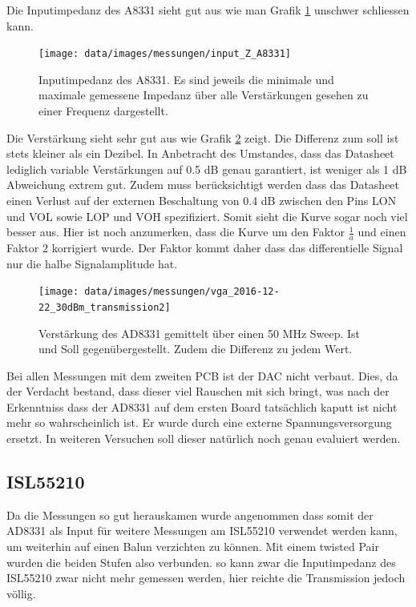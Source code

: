Die Inputimpedanz des A8331 sieht gut aus wie man Grafik \ref{fig:Z_in_A8331} unschwer schliessen kann.

\begin{figure}[H]
\begin{center}
    \texttt{[image: data/images/messungen/input\_Z\_A8331]}
    \caption{Inputimpedanz des A8331. Es sind jeweils die minimale und maximale gemessene Impedanz über alle Verstärkungen gesehen zu einer Frequenz dargestellt.}
    \label{fig:Z_in_A8331}
\end{center}
\end{figure}

Die Verstärkung sieht sehr gut aus wie Grafik \ref{fig:T_A8331} zeigt. Die Differenz zum soll ist stets kleiner als ein Dezibel. In Anbetracht des Umstandes, dass das Datasheet lediglich variable Verstärkungen auf 0.5 dB genau garantiert, ist weniger als 1 dB Abweichung extrem gut. Zudem muss berücksichtigt werden dass das Datasheet einen Verlust auf der externen Beschaltung von 0.4 dB zwischen den Pins LON und VOL sowie LOP und VOH spezifiziert.
Somit sieht die Kurve sogar noch viel besser aus.
Hier ist noch anzumerken, dass die Kurve um den Faktor $\frac{1}{a}$ und einen Faktor 2 korrigiert wurde. Der Faktor kommt daher dass das differentielle Signal nur die halbe Signalamplitude hat. 

\begin{figure}[H]
\begin{center}
    \texttt{[image: data/images/messungen/vga\_2016-12-22\_30dBm\_transmission2]}
    \caption{Verstärkung des AD8331 gemittelt über einen 50 MHz Sweep. Ist und Soll gegenübergestellt. Zudem die Differenz zu jedem Wert.}
    \label{fig:T_A8331}
\end{center}
\end{figure}

Bei allen Messungen mit dem zweiten PCB ist der DAC nicht verbaut. Dies, da der Verdacht bestand, dass dieser viel Rauschen mit sich bringt, was nach der Erkenntniss dass der AD8331 auf dem ersten Board tatsächlich kaputt ist nicht mehr so wahrscheinlich ist. Er wurde durch eine externe Spannungsversorgung ersetzt. In weiteren Versuchen soll dieser natürlich noch genau evaluiert werden.

\subsection{ISL55210}

Da die Messungen so gut herauskamen wurde angenommen dass somit der AD8331 als Input für weitere Messungen am ISL55210 verwendet werden kann, um weiterhin auf einen Balun verzichten zu können. Mit einem twisted Pair wurden die beiden Stufen also verbunden. so kann zwar die Inputimpedanz des ISL55210 zwar nicht mehr gemessen werden, hier reichte die Transmission jedoch völlig.

